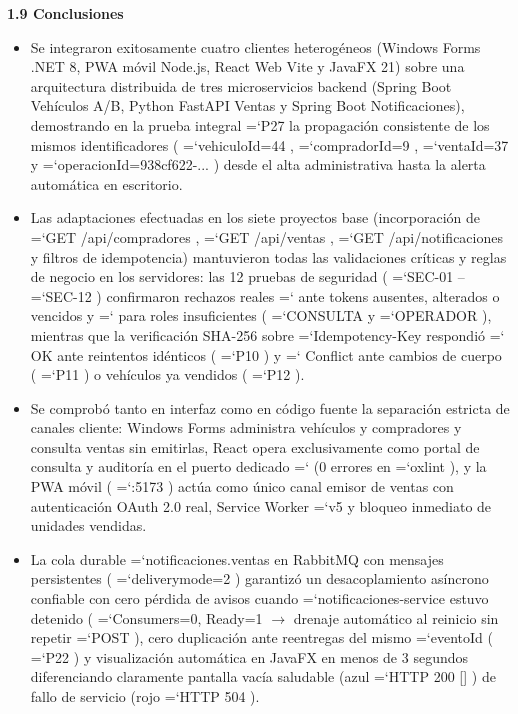\documentclass[11pt,a4paper]{article}
\renewcommand{\_}{\oldunderscore\allowbreak}
\DeclareRobustCommand{\texttt}[1]{%
  {\upshape\ttfamily\fontsize{9}{10.8}\selectfont\hyphenchar\font=`\-\relax #1}%
}
\begin{document}
\vspace{0.2cm}

\noindent\textbf{1.9 Conclusiones}

\begin{itemize}[leftmargin=*,itemsep=3pt,topsep=2pt]
  \item Se integraron exitosamente cuatro clientes heterogéneos (Windows Forms .NET 8, PWA móvil Node.js, React Web Vite y JavaFX 21) sobre una arquitectura distribuida de tres microservicios backend (Spring Boot Vehículos A/B, Python FastAPI Ventas y Spring Boot Notificaciones), demostrando en la prueba integral \texttt{P27} la propagación consistente de los mismos identificadores (\texttt{vehiculoId=\allowbreak{}44}, \texttt{compradorId=\allowbreak{}9}, \texttt{ventaId=37} y \texttt{operacionId=\allowbreak{}938cf622-...}) desde el alta administrativa hasta la alerta automática en escritorio.
  \item Las adaptaciones efectuadas en los siete proyectos base (incorporación de \texttt{GET /\allowbreak{}api/\allowbreak{}compradores}, \texttt{GET /\allowbreak{}api/\allowbreak{}ventas}, \texttt{GET /\allowbreak{}api/\allowbreak{}notificaciones} y filtros de idempotencia) mantuvieron todas las validaciones críticas y reglas de negocio en los servidores: las 12 pruebas de seguridad (\texttt{SEC-01}--\texttt{SEC-12}) confirmaron rechazos reales \texttt{401} ante tokens ausentes, alterados o vencidos y \texttt{403} para roles insuficientes (\texttt{CONSULTA} y \texttt{OPERADOR}), mientras que la verificación SHA-256 sobre \texttt{Idempotency-Key} respondió \texttt{200 OK} ante reintentos idénticos (\texttt{P10}) y \texttt{409 Conflict} ante cambios de cuerpo (\texttt{P11}) o vehículos ya vendidos (\texttt{P12}).
  \item Se comprobó tanto en interfaz como en código fuente la separación estricta de canales cliente: Windows Forms administra vehículos y compradores y consulta ventas sin emitirlas, React opera exclusivamente como portal de consulta y auditoría en el puerto dedicado \texttt{5174} (0 errores en \texttt{oxlint}), y la PWA móvil (\texttt{:5173}) actúa como único canal emisor de ventas con autenticación OAuth 2.0 real, Service Worker \texttt{v5} y bloqueo inmediato de unidades vendidas.
  \item La cola durable \texttt{notificaciones.\allowbreak{}ventas} en RabbitMQ con mensajes persistentes (\texttt{delivery\_mode=\allowbreak{}2}) garantizó un desacoplamiento asíncrono confiable con cero pérdida de avisos cuando \texttt{notificaciones-service} estuvo detenido (\texttt{Consumers=\allowbreak{}0, Ready=\allowbreak{}1} $\rightarrow$ drenaje automático al reinicio sin repetir \texttt{POST}), cero duplicación ante reentregas del mismo \texttt{eventoId} (\texttt{P22}) y visualización automática en JavaFX en menos de 3 segundos diferenciando claramente pantalla vacía saludable (azul \texttt{HTTP 200 []}) de fallo de servicio (rojo \texttt{HTTP 504}).

\end{itemize}
\end{document}
